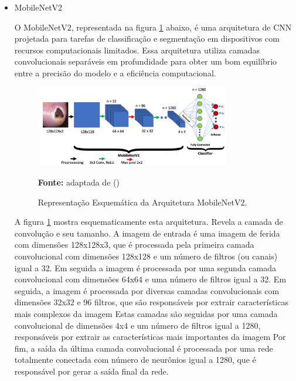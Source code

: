 \begin{itemize}
        \clearpage
        
        \item {MobileNetV2}
    
            O \ac{MobileNetV2}, representada na figura \ref{fig:arquiteturaMobileNetV2} abaixo, é uma arquitetura de \ac{CNN} projetada para tarefas de classificação e segmentação em dispositivos com recursos computacionais limitados. Essa arquitetura utiliza camadas convolucionais separáveis em profundidade para obter um bom equilíbrio entre a precisão do modelo e a eficiência computacional. 
        
                \begin{figure}[htbp]
                    \centering
                    \caption{Representação Esquemática da Arquitetura \ac{MobileNetV2}.}
                    \includegraphics[width=0.8\textwidth]{img/arquitetura_MobileNetV2.png}
                    \label{fig:arquiteturaMobileNetV2}
                    \par\medskip\textbf{Fonte:} adaptada de (\cite{akay2021deep})
                \end{figure}   
        
            A figura \ref{fig:arquiteturaMobileNetV2} mostra esquematicamente esta arquitetura. Revela a camada de convolução e seu tamanho. A imagem de entrada é uma imagem de ferida com dimensões 128x128x3, que é processada pela primeira camada convolucional com dimensões 128x128 e um número de filtros (ou canais) igual a 32. Em seguida a imagem é processada por uma segunda camada convolucional com dimensões 64x64 e uma número de filtros igual a 32. Em seguida, a imagem é processada por diversas camadas convolucionais com dimensões 32x32 e 96 filtros, que são responsáveis por extrair características mais complexos da imagem Estas camadas são seguidas por uma camada convolucional de dimensões 4x4 e um número de filtros igual a 1280, responsáveis por extrair as características mais importantes da imagem Por fim, a saída da última camada convolucional é processada por uma rede totalmente conectada com número de neurônios igual a 1280, que é responsável por gerar a saída final da rede.
            
    \end{itemize}

